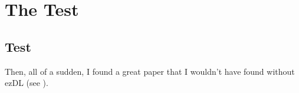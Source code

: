 \documentclass{article}
\begin{document}
\chapter{The Test}

\section{Test}

Then, all of a sudden, I found a great paper that I wouldn't have found without ezDL (see \cite{citationkey}).


\clearpage



\end{document}
